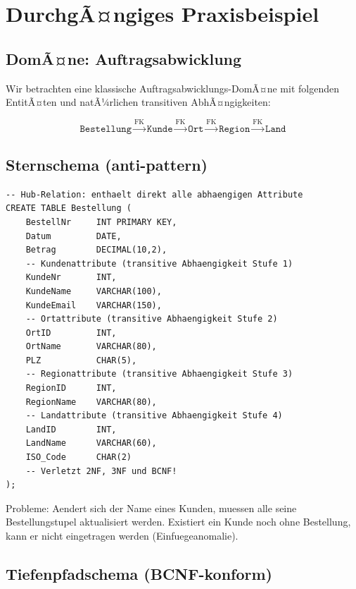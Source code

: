 ﻿\documentclass[12pt,a4paper]{article}
\theoremstyle{definition}
\theoremstyle{remark}
\begin{document}
\section{DurchgÃ¤ngiges Praxisbeispiel}
\label{sec:beispiel}

\subsection{DomÃ¤ne: Auftragsabwicklung}

Wir betrachten eine klassische Auftragsabwicklungs-DomÃ¤ne mit folgenden
EntitÃ¤ten und natÃ¼rlichen transitiven AbhÃ¤ngigkeiten:

\[
  \texttt{Bestellung} \xrightarrow{\text{FK}} \texttt{Kunde}
  \xrightarrow{\text{FK}} \texttt{Ort}
  \xrightarrow{\text{FK}} \texttt{Region}
  \xrightarrow{\text{FK}} \texttt{Land}
\]

\subsection{Sternschema (anti-pattern)}

\begin{lstlisting}[caption={Anti-Pattern: Sternschema mit denormalisierten Attributen in Hub-Relation},label=lst:stern]
-- Hub-Relation: enthaelt direkt alle abhaengigen Attribute
CREATE TABLE Bestellung (
    BestellNr     INT PRIMARY KEY,
    Datum         DATE,
    Betrag        DECIMAL(10,2),
    -- Kundenattribute (transitive Abhaengigkeit Stufe 1)
    KundeNr       INT,
    KundeName     VARCHAR(100),
    KundeEmail    VARCHAR(150),
    -- Ortattribute (transitive Abhaengigkeit Stufe 2)
    OrtID         INT,
    OrtName       VARCHAR(80),
    PLZ           CHAR(5),
    -- Regionattribute (transitive Abhaengigkeit Stufe 3)
    RegionID      INT,
    RegionName    VARCHAR(80),
    -- Landattribute (transitive Abhaengigkeit Stufe 4)
    LandID        INT,
    LandName      VARCHAR(60),
    ISO_Code      CHAR(2)
    -- Verletzt 2NF, 3NF und BCNF!
);
\end{lstlisting}

Probleme: Aendert sich der Name eines Kunden, muessen alle seine
Bestellungstupel aktualisiert werden. Existiert ein Kunde noch ohne
Bestellung, kann er nicht eingetragen werden (Einfuegeanomalie).

\subsection{Tiefenpfadschema (BCNF-konform)}
\end{document}
